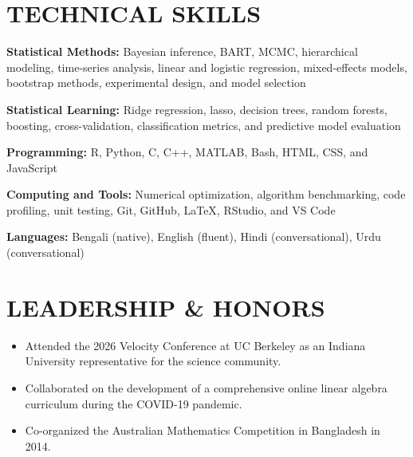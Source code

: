 \documentclass[10pt,letterpaper]{article}
\newenvironment{resumeItems}{%
	\begin{itemize}[
		label=\textbullet,
		leftmargin=14pt,
		labelsep=5pt,
		itemsep=0.5pt,
		topsep=1.0pt,
		parsep=0pt,
		partopsep=0pt
	]
}{%
	\end{itemize}
}
\begin{document}
\section*{TECHNICAL SKILLS}

\textbf{Statistical Methods:}
Bayesian inference, BART, MCMC, hierarchical modeling, time-series analysis, linear and logistic regression, mixed-effects models, bootstrap methods, experimental design, and model selection

\textbf{Statistical Learning:}
Ridge regression, lasso, decision trees, random forests, boosting, cross-validation, classification metrics, and predictive model evaluation

\textbf{Programming:}
R, Python, C, C++, MATLAB, Bash, HTML, CSS, and JavaScript

\textbf{Computing and Tools:}
Numerical optimization, algorithm benchmarking, code profiling, unit testing, Git, GitHub, LaTeX, RStudio, and VS Code

\textbf{Languages:}
Bengali (native), English (fluent), Hindi (conversational), Urdu (conversational)

\section*{LEADERSHIP \& HONORS}

\begin{resumeItems}
	\item Attended the 2026 Velocity Conference at UC Berkeley as an Indiana University representative for the science community.

	\item Collaborated on the development of a comprehensive online linear algebra curriculum during the COVID-19 pandemic.

	\item Co-organized the Australian Mathematics Competition in Bangladesh in 2014.
\end{resumeItems}
\end{document}
